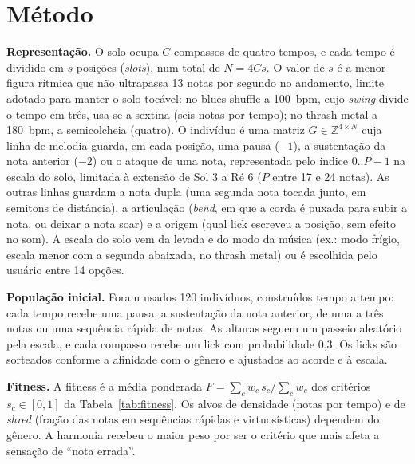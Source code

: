 \documentclass{article}
\begin{document}
\section{Método}

\textbf{Representação.} O solo ocupa $C$ compassos de quatro tempos, e cada tempo é
dividido em $s$ posições (\emph{slots}), num total de $N=4Cs$. O valor de $s$ é a menor
figura rítmica que não ultrapassa 13 notas por segundo no andamento, limite adotado para
manter o solo tocável: no blues shuffle a 100~bpm, cujo \emph{swing} divide o tempo em
três, usa-se a sextina (seis notas por tempo); no thrash metal a 180~bpm, a
semicolcheia (quatro). O indivíduo é uma matriz $G\in\mathbb{Z}^{4\times N}$ cuja linha de melodia
guarda, em cada posição, uma pausa ($-1$), a sustentação da nota anterior ($-2$) ou o
ataque de uma nota, representada pelo índice $0..P{-}1$ na escala do solo, limitada à
extensão de Sol 3 a Ré 6 ($P$ entre 17 e 24 notas). As outras linhas guardam a nota
dupla (uma segunda nota tocada junto, em semitons de distância), a articulação
(\emph{bend}, em que a corda é puxada para subir a nota, ou deixar a nota soar) e a
origem (qual lick escreveu a posição, sem efeito no som). A escala
do solo vem da levada e do modo da música (ex.: modo frígio, escala menor com a segunda
abaixada, no thrash metal) ou é escolhida pelo usuário entre 14 opções.

\textbf{População inicial.} Foram usados 120 indivíduos, construídos tempo a tempo:
cada tempo recebe uma pausa, a sustentação da nota anterior, de uma a três notas ou uma
sequência rápida de notas. As alturas seguem um passeio aleatório pela escala, e cada compasso recebe um lick com probabilidade 0,3. Os
licks são sorteados conforme a afinidade com o gênero e ajustados ao acorde e à escala.

\textbf{Fitness.} A fitness é a média ponderada $F=\sum_c w_c\,s_c/\sum_c w_c$ dos
critérios $s_c\in[0,1]$ da Tabela~\ref{tab:fitness}. Os alvos de densidade (notas por
tempo) e de \emph{shred} (fração das notas em sequências rápidas e virtuosísticas)
dependem do gênero. A harmonia recebeu o maior peso por ser o critério que mais afeta a sensação de
``nota errada''.
\end{document}
